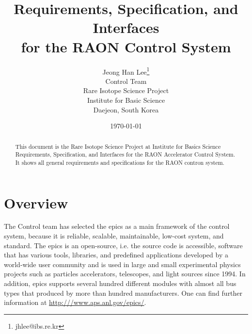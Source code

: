 \documentclass[11pt
  , a4paper
  , article
  , oneside
]{memoir}
\begin{document}
\newcommand{\technumber}{
  RAON Control-Document Series\\
  Revision : v0.1,   Release : Nov, 19, 2014}
\title{\textbf{Requirements, Specification, and Interfaces \\ for the RAON Control System}}

\author{Jeong Han Lee\thanks{jhlee@ibs.re.kr} \\
  Control Team \\
  Rare Isotope Science Project\\
  Institute for Basic Science\\
  Daejeon, South Korea
}
\date{\today}

\renewcommand{\maketitlehooka}{\begin{flushright}\textsf{\technumber}\end{flushright}}

\maketitle

\begin{abstract}
This document is the Rare Isotope Science Project at Institute for Basics Science Requirements, Specification, and Interfaces for the RAON Accelerator Control System. It shows all general requirements and specifications for the RAON contron system. 
\end{abstract}

 
\printglossaries

\newpage
\chapter{Overview}
\label{overview}
The Control team has selected the \Gls{epics} \cite{EPICS3.14.12.3} as a main framework of the control system, because it is reliable, scalable, maintainable, low-cost system, and standard. The \Gls{epics} is an open-source, i.e. the source code is accessible, software that has various tools, libraries, and predefined applications developed by a world-wide user community and is used in large and small experimental physics projects such as particles accelerators, telescopes, and light sources since 1994. In addition, \Gls{epics} supports several hundred different modules with almost all bus types that produced by more than hundred manufacturers. One can find further information at \url{http:///www.aps.anl.gov/epics/}.
\end{document}
